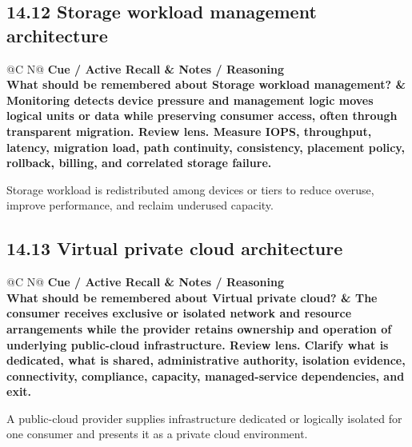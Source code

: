 \documentclass[11pt]{article}
\newcommand{\CornellHeader}{\rowcolor{Navy}\color{white}\bfseries Cue / Active Recall & \color{white}\bfseries Notes / Reasoning \\\endhead}
\newcommand{\CornellRow}[2]{\cellcolor{CueGray}\textbf{#1} & #2 \\\addlinespace[3pt]}
\begin{document}
\subsection{14.12 Storage workload management architecture}
\begin{longtable}{@{}C N@{}}
\CornellHeader
\CornellRow{What should be remembered about Storage workload management?}{Monitoring detects device pressure and management logic moves logical units or data while preserving consumer access, often through transparent migration. \textbf{Review lens.} Measure IOPS, throughput, latency, migration load, path continuity, consistency, placement policy, rollback, billing, and correlated storage failure.}
\end{longtable}
\begin{sectionsummarybox}
Storage workload is redistributed among devices or tiers to reduce overuse, improve performance, and reclaim underused capacity.
\end{sectionsummarybox}
\subsection{14.13 Virtual private cloud architecture}
\begin{longtable}{@{}C N@{}}
\CornellHeader
\CornellRow{What should be remembered about Virtual private cloud?}{The consumer receives exclusive or isolated network and resource arrangements while the provider retains ownership and operation of underlying public-cloud infrastructure. \textbf{Review lens.} Clarify what is dedicated, what is shared, administrative authority, isolation evidence, connectivity, compliance, capacity, managed-service dependencies, and exit.}
\end{longtable}
\begin{sectionsummarybox}
A public-cloud provider supplies infrastructure dedicated or logically isolated for one consumer and presents it as a private cloud environment.
\end{sectionsummarybox}
\end{document}
